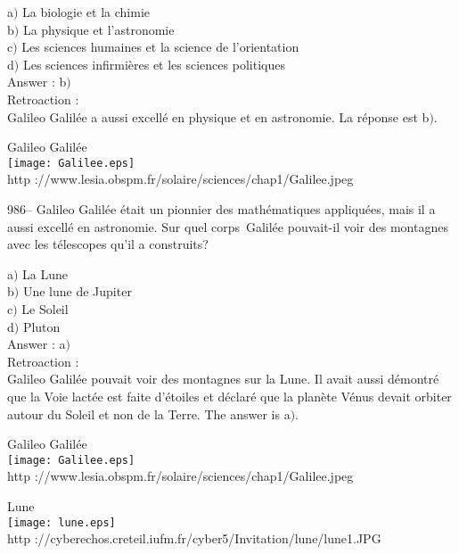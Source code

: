 ﻿\documentclass[letterpaper, 12pt]{article}
\begin{document}
a$)$ La biologie et la chimie \\
b$)$ La physique et l'astronomie \\
c$)$ Les sciences humaines et la science de l'orientation \\
d$)$ Les sciences infirmi\`eres et les sciences politiques\\

Answer : b$)$\\

Retroaction : \\
Galileo Galil\'ee a aussi excell\'e en physique et en astronomie. La
r\'eponse est b$)$.

        \begin{center}
        Galileo Galil\'ee\\
    \texttt{[image: Galilee.eps]}\\
        {\footnotesize http
://www.lesia.obspm.fr/solaire/sciences/chap1/Galilee.jpeg}
    \end{center}

986-- Galileo Galil\'ee \'etait un pionnier des math\'ematiques
appliqu\'ees, mais il a aussi excell\'e en astronomie. Sur quel \og
corps\fg\ Galil\'ee pouvait-il voir des montagnes avec les
t\'elescopes qu'il a construits?

a$)$ La Lune \\
b$)$ Une lune de Jupiter \\
c$)$ Le Soleil \\
d$)$ Pluton\\

Answer : a$)$\\

Retroaction : \\
Galileo Galil\'ee pouvait voir des montagnes sur la Lune. Il avait
aussi d\'emontr\'e que la Voie lact\'ee est faite d'\'etoiles et
d\'eclar\'e que la plan\`ete V\'enus devait orbiter autour du Soleil
et non de la Terre.
The answer is a$)$.\\

        \begin{center}
        Galileo Galil\'ee\\
    \texttt{[image: Galilee.eps]}\\
        {\footnotesize http
://www.lesia.obspm.fr/solaire/sciences/chap1/Galilee.jpeg}
    \end{center}

        \begin{center}
        Lune\\
    \texttt{[image: lune.eps]}\\
        {\footnotesize http
://cyberechos.creteil.iufm.fr/cyber5/Invitation/lune/lune1.JPG}
    \end{center}
\end{document}
